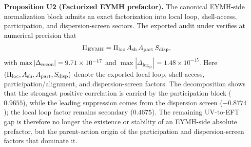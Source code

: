 \documentclass[aps,prd,onecolumn,notitlepage,nofootinbib,superscriptaddress,11pt,floatfix]{revtex4-2}
\begin{document}
\medskip\noindent\textbf{Proposition U2 (Factorized EYMH prefactor).}
The canonical EYMH-side normalization block admits an exact factorization into local loop, shell-access, participation, and dispersion-screen sectors. The exported audit under  verifies at numerical precision that
\begin{align}
\Pi_{\rm EYMH}=\Pi_{\rm loc}\,A_{\rm sh}\,A_{\rm part}\,S_{\rm disp},
\end{align}
with $\max|\Delta_{\rm recon}|=9.71\times10^{-17}$ and $\max|\Delta_{\log_{10}}|=1.48\times10^{-15}$. Here $(\Pi_{\rm loc},A_{\rm sh},A_{\rm part},S_{\rm disp})$ denote the exported local loop, shell-access, participation/alignment, and dispersion-screen factors. The decomposition shows that the strongest positive correlation is carried by the participation block ($0.9655$), while the leading suppression comes from the dispersion screen ($-0.8774$); the local loop factor remains secondary ($0.4675$). The remaining UV-to-EFT gap is therefore no longer the existence or stability of an EYMH-side absolute prefactor, but the parent-action origin of the participation and dispersion-screen factors that dominate it.
\end{document}
